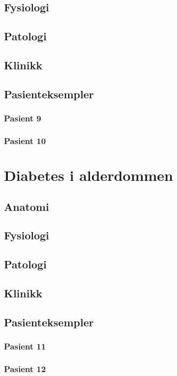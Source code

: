 \documentclass[a4paper,12pt,twoside]{memoir}
\begin{document}
		\section{Fysiologi}
		\section{Patologi}
		\section{Klinikk}
		\section{Pasienteksempler}
			\subsection{Pasient 9}
			\subsection{Pasient 10}
	\chapter{Diabetes i alderdommen}
		\section{Anatomi}
		\section{Fysiologi}
		\section{Patologi}
		\section{Klinikk}
		\section{Pasienteksempler}
			\subsection{Pasient 11}
			\subsection{Pasient 12}

 

 \renewcommand{\bibname}{Kilder:}
            {}
			
\end{document}
